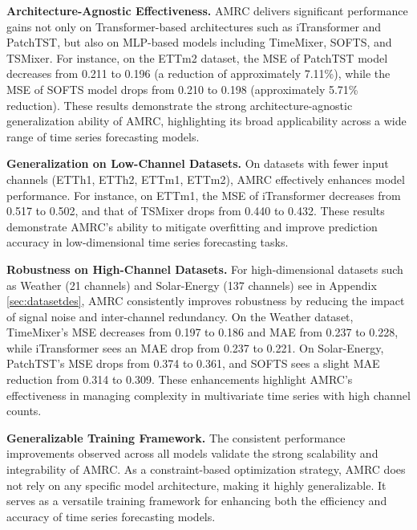 \documentclass{article}
\begin{document}
\textbf{Architecture-Agnostic Effectiveness.} AMRC delivers significant performance gains not only on Transformer-based architectures such as iTransformer and PatchTST, but also on MLP-based models including TimeMixer, SOFTS, and TSMixer. For instance, on the ETTm2 dataset, the MSE of PatchTST model decreases from 0.211 to 0.196 (a reduction of approximately 7.11\%), while the MSE of SOFTS model drops from 0.210 to 0.198 (approximately 5.71\% reduction). These results demonstrate the strong architecture-agnostic generalization ability of AMRC, highlighting its broad applicability across a wide range of time series forecasting models.

\textbf{Generalization on Low-Channel Datasets.} On datasets with fewer input channels (ETTh1, ETTh2, ETTm1, ETTm2), AMRC effectively enhances model performance. For instance, on ETTm1, the MSE of iTransformer decreases from 0.517 to 0.502, and that of TSMixer drops from 0.440 to 0.432.  These results demonstrate AMRC’s ability to mitigate overfitting and improve prediction accuracy in low-dimensional time series forecasting tasks.

\textbf{Robustness on High-Channel Datasets.} For high-dimensional datasets such as Weather (21 channels) and Solar-Energy (137 channels) see in Appendix \ref{sec:datasetdes}, AMRC consistently improves robustness by reducing the impact of signal noise and inter-channel redundancy. On the Weather dataset, TimeMixer’s MSE decreases from 0.197 to 0.186 and MAE from 0.237 to 0.228, while iTransformer sees an MAE drop from 0.237 to 0.221. On Solar-Energy, PatchTST's MSE drops from 0.374 to 0.361, and SOFTS sees a slight MAE reduction from 0.314 to 0.309. These enhancements highlight AMRC's effectiveness in managing complexity in multivariate time series with high channel counts.

\textbf{Generalizable Training Framework.} The consistent performance improvements observed across all models validate the strong scalability and integrability of AMRC. As a constraint-based optimization strategy, AMRC does not rely on any specific model architecture, making it highly generalizable. It serves as a versatile training framework for enhancing both the efficiency and accuracy of time series forecasting models.
\end{document}
